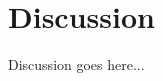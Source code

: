 \documentclass{article}\usepackage[]{graphicx}\usepackage[]{color}
\renewcommand{\indent}{\hskip 20pt}
\begin{document}
\section{Discussion}

\indent Discussion goes here...
\newline


%
%
\end{document}

